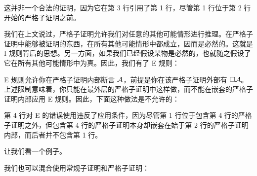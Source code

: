 \begin{fitchproof}
		\PR
		\open
		\AS
		\close
\end{fitchproof}

这并非一个合法的证明，因为它在第 3 行引用了第 1 行，尽管第 1 行位于第 2 行开始的严格子证明之前。

我们在上文说过，严格子证明允许我们对任意的其他可能情形进行推理。在严格子证明中能够被证明的东西，在所有其他可能情形中都成立，因而是必然的。这就是 \ebox I 规则背后的思想。另一方面，如果我们已经假设某物是必然的，也就随之假设了它在所有其他可能情形中为真。因此，我们有了 \ebox E 规则：

\ebox E 规则允许你在严格子证明内部断言 $\mathcal{A}$，前提是你在该严格子证明外部有 $\Box \mathcal{A}$。上述限制意味着，你只能在最外层的严格子证明中这样做，而不能在嵌套的严格子证明内部应用 \ebox E 规则。因此，下面这种做法是不允许的：

\begin{fitchproof}
	\open
	\AS
	\open
	\AS
\close\close
\end{fitchproof}

第 4 行对 \ebox E 的错误使用违反了应用条件，因为尽管第 1 行位于包含第 4 行的严格子证明之外，但包含第 4 行的严格子证明本身却嵌套在始于第 2 行的严格子证明内部，而后者并不包含第 1 行。

让我们看一个例子。

\begin{fitchproof}
		\PR
		\PR
		\open
		\AS
		\close
\end{fitchproof}

我们也可以混合使用常规子证明和严格子证明：

\begin{fitchproof}
		\PR
		\open
		\AS
		\open
		\AS
		\close
		\close
		 
\end{fitchproof}

